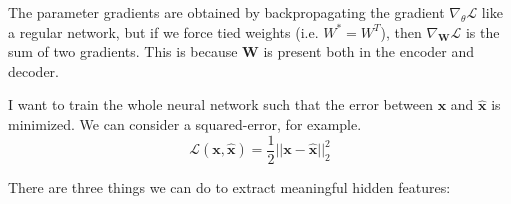     The parameter gradients are obtained by backpropagating the gradient $\nabla_{\theta} \mathcal{L}$ like a regular network, but if we force tied weights (i.e. $W^\ast = W^T$), then $\nabla_{\mathbf{W}} \mathcal{L}$ is the sum of two gradients. This is because $\mathbf{W}$ is present both in the encoder and decoder. 

    I want to train the whole neural network such that the error between $\mathbf{x}$ and $\hat{\mathbf{x}}$ is minimized. We can consider a squared-error, for example. 
    \begin{equation}
      \mathcal{L}(\mathbf{x}, \hat{\mathbf{x}}) = \frac{1}{2} ||\mathbf{x} - \hat{\mathbf{x}}||_2^2
    \end{equation}


    There are three things we can do to extract meaningful hidden features: 
